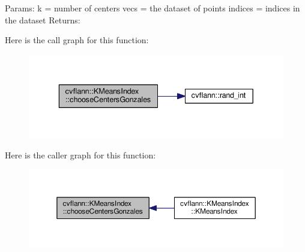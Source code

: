 Params\-: k = number of centers vecs = the dataset of points indices = indices in the dataset Returns\-: 

Here is the call graph for this function\-:\nopagebreak
\begin{figure}[H]
\begin{center}
\leavevmode
\includegraphics[width=336pt]{classcvflann_1_1KMeansIndex_a224fbbe5fdc60db9374ddbf499b0e9d3_cgraph}
\end{center}
\end{figure}




Here is the caller graph for this function\-:\nopagebreak
\begin{figure}[H]
\begin{center}
\leavevmode
\includegraphics[width=350pt]{classcvflann_1_1KMeansIndex_a224fbbe5fdc60db9374ddbf499b0e9d3_icgraph}
\end{center}
\end{figure}


